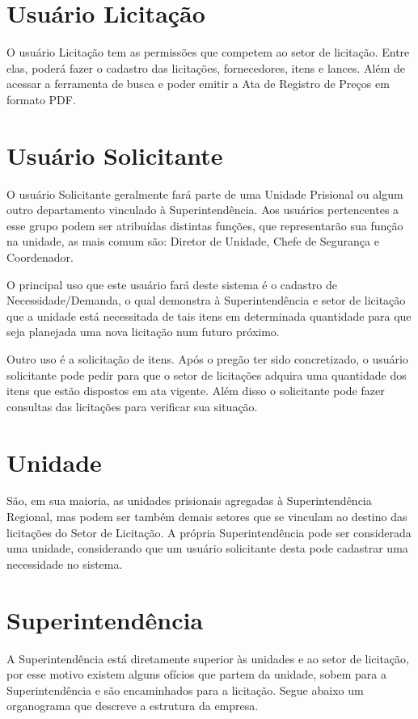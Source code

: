 \documentclass[ ]{article}
\begin{document}
\section{Usuário Licitação}
	O usuário Licitação tem as permissões que competem ao setor de licitação. Entre elas, poderá fazer o cadastro das licitações, fornecedores, itens e lances. Além de acessar a ferramenta de busca e poder emitir a Ata de Registro de Preços em formato PDF.

\section{Usuário Solicitante}
	O usuário Solicitante geralmente fará parte de uma Unidade Prisional ou algum outro departamento vinculado à Superintendência. Aos usuários pertencentes a esse grupo podem ser atribuídas distintas funções, que representarão sua função na unidade, as mais comum são: Diretor de Unidade, Chefe de Segurança e Coordenador.
	
	O principal uso que este usuário fará deste sistema é o cadastro de Necessidade/Demanda, o qual demonstra à Superintendência e setor de licitação que a unidade está necessitada de tais itens em determinada quantidade para que seja planejada uma nova licitação num futuro próximo.
	
	Outro uso é a solicitação de itens. Após o pregão ter sido concretizado, o usuário solicitante pode pedir para que o setor de licitações adquira uma quantidade dos itens que estão dispostos em ata vigente. Além disso o solicitante pode fazer consultas das licitações para verificar sua situação.

\section{Unidade}
	São, em sua maioria, as unidades prisionais agregadas à Superintendência Regional, mas podem ser também demais setores que se vinculam ao destino das licitações do Setor de Licitação. A própria Superintendência pode ser considerada uma unidade, considerando que um usuário solicitante desta pode cadastrar uma necessidade no sistema.
	
\section{Superintendência}
	A Superintendência está diretamente superior às unidades e ao setor de licitação, por esse motivo existem alguns ofícios que partem da unidade, sobem para a Superintendência e são encaminhados para a licitação. Segue abaixo um organograma que descreve a estrutura da empresa.
	
\end{document}
